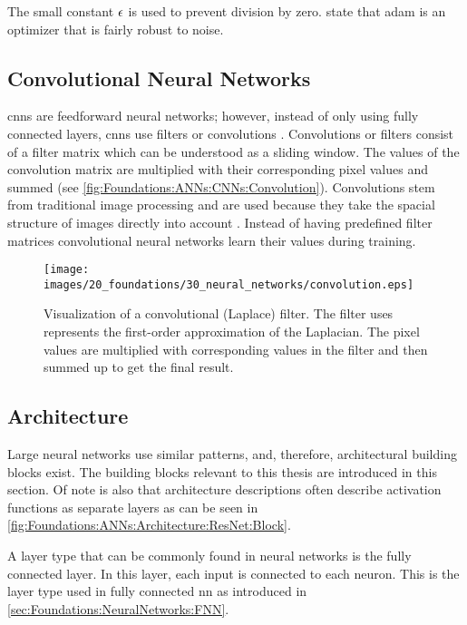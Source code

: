 The small constant $\mathit{\epsilon}$ is used to prevent division by zero. \textcite{kingma2017adam} state that \ac{adam} is an optimizer that is fairly robust to noise.


\subsection{Convolutional Neural Networks}
\label{sec:Foundations:NeuralNetworks:CNN}

\Acp{cnn} are feedforward neural networks; however, instead of only using fully connected layers, \acp{cnn} use filters or convolutions \cite{teuwen2020convolutional}. Convolutions or filters consist of a filter matrix which can be understood as a sliding window. The values of the convolution matrix are multiplied with their corresponding pixel values and summed (see \autoref{fig:Foundations:ANNs:CNNs:Convolution}). Convolutions stem from traditional image processing \cite{shih2010image} and are used because they take the spacial structure of images directly into account \cite{nielsen2015neural}. Instead of having predefined filter matrices convolutional neural networks learn their values during training.

\begin{figure}
    \centering
    \texttt{[image: images/20\_foundations/30\_neural\_networks/convolution.eps]}
    \caption[Convolutional filter visualization]{Visualization of a convolutional (Laplace) filter. The filter uses represents the first-order approximation of the Laplacian. The pixel values are multiplied with corresponding values in the filter and then summed up to get the final result. }
    \label{fig:Foundations:ANNs:CNNs:Convolution}
\end{figure}


\subsection{Architecture}
\label{sec:Foundations:NeuralNetworks:Architecture}

Large neural networks use similar patterns, and, therefore, architectural building blocks exist. The building blocks relevant to this thesis are introduced in this section.
Of note is also that architecture descriptions often describe activation functions as separate layers as can be seen in \autoref{fig:Foundations:ANNs:Architecture:ResNet:Block}.

A layer type that can be commonly found in neural networks is the fully connected layer. In this layer, each input is connected to each neuron. This is the layer type used in fully connected \ac{nn} as introduced in \autoref{sec:Foundations:NeuralNetworks:FNN}.

